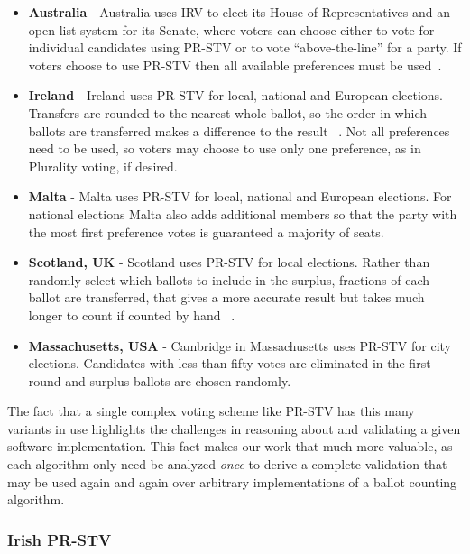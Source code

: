 \documentclass[runningheads,a4paper]{llncs}
\begin{document}
\begin{itemize}
\item \textbf{Australia} - Australia uses IRV to elect its House of
  Representatives and an open list system for its Senate, where voters
  can choose either to vote for individual candidates using PR-STV or
  to vote ``above-the-line'' for a party.  If voters choose to use
  PR-STV then all available preferences must be
  used~\cite{farrell2006australian}.

\item \textbf{Ireland} - Ireland uses PR-STV for local, national and
  European elections.  Transfers are rounded to the nearest whole
  ballot, so the order in which ballots are transferred makes a
  difference to the result ~\cite{mcgaley2003electronic}. Not all
  preferences need to be used, so voters may choose to use only one
  preference, as in Plurality voting, if
  desired. 

\item \textbf{Malta} - Malta uses PR-STV for local, national and
  European elections. For national elections Malta also adds
  additional members so that the party with the most first preference
  votes is guaranteed a majority of seats.

\item \textbf{Scotland, UK} - Scotland uses PR-STV for local
  elections. Rather than randomly select which ballots to include in
  the surplus, fractions of each ballot are transferred, that gives a
  more accurate result but takes much longer to count if counted by
  hand ~\cite{gilmour2007detailed}.

\item \textbf{Massachusetts, USA} - Cambridge in Massachusetts uses
  PR-STV for city elections.  Candidates with less than fifty votes
  are eliminated in the first round and surplus ballots are chosen
  randomly.

\end{itemize}

The fact that a single complex voting scheme like PR-STV has this many
variants in use highlights the challenges in reasoning about and
validating a given software implementation.  This fact makes our work
that much more valuable, as each algorithm only need be analyzed
\emph{once} to derive a complete validation that may be used again and
again over arbitrary implementations of a ballot counting algorithm.

\subsubsection{Irish PR-STV} 
\end{document}
